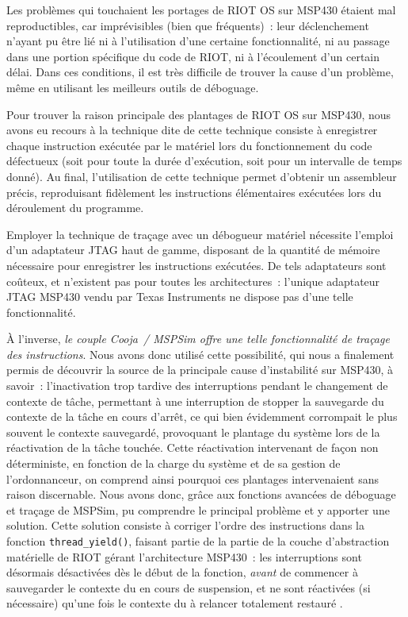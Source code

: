 \smallskip

Les problèmes qui touchaient les portages de RIOT OS sur MSP430 étaient mal
reproductibles, car imprévisibles (bien que fréquents)~: leur déclenchement
n'ayant pu être lié ni à l'utilisation d'une certaine fonctionnalité, ni au
passage dans une portion spécifique du code de RIOT, ni à l'écoulement d'un
certain délai. Dans ces conditions, il est très difficile de trouver la
cause d'un problème, même en utilisant les meilleurs outils de déboguage.

Pour trouver la raison principale des plantages de RIOT OS sur MSP430,
nous avons eu recours à la technique dite de 
cette technique consiste à enregistrer chaque instruction exécutée par
le matériel lors du fonctionnement du code défectueux (soit pour toute
la durée d'exécution, soit pour un intervalle de temps donné). Au final,
l'utilisation de cette technique permet d'obtenir un 
assembleur précis, reproduisant fidèlement les instructions élémentaires
exécutées lors du déroulement du programme.

Employer la technique de traçage avec un débogueur matériel nécessite
l'emploi d'un adaptateur JTAG haut de gamme, disposant de la quantité
de mémoire nécessaire pour enregistrer les instructions exécutées. De tels
adaptateurs sont coûteux, et n'existent pas pour toutes les architectures~:
l'unique adaptateur JTAG MSP430 vendu par Texas Instruments ne dispose pas
d'une telle fonctionnalité.

À l'inverse, \emph{le couple Cooja~/ MSPSim offre une telle fonctionnalité
de traçage des instructions}. Nous avons donc utilisé cette possibilité,
qui nous a finalement permis de découvrir la source de la principale cause
d'instabilité sur MSP430, à savoir~: l'inactivation trop tardive des
interruptions pendant le changement de contexte de tâche, permettant
à une interruption de stopper la sauvegarde du contexte de la tâche
en cours d'arrêt, ce qui bien évidemment corrompait le plus souvent
le contexte sauvegardé, provoquant le plantage du système lors de la
réactivation de la tâche touchée. Cette réactivation intervenant de façon
non déterministe, en fonction de la charge du système et de sa gestion de
l'ordonnanceur, on comprend ainsi pourquoi ces plantages intervenaient
sans raison  discernable. Nous avons donc, grâce aux
fonctions avancées de déboguage et traçage de MSPSim, pu comprendre
le principal problème et y apporter une solution. Cette solution consiste
à corriger l'ordre des instructions dans la fonction \texttt{thread\_yield()},
faisant partie de la partie de la couche d'abstraction matérielle de RIOT
gérant l'architecture MSP430~: les interruptions sont désormais désactivées
dès le début de la fonction, \emph{avant} de commencer à sauvegarder le
contexte du  en cours de suspension, et ne sont réactivées
(si nécessaire) qu'une fois le contexte du  à relancer
totalement restauré \cite{PRriotFix2MSP430}.

